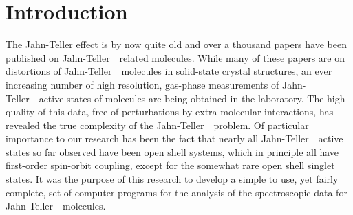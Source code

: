 \documentclass{article}
\newcommand{\JT}{Jahn-Teller\ }
\newcommand{\socjt}{{\bf SOCJT }}
\newcommand{\socrt}{{\bf SOCRT}}
\newcommand{\etoe}{{\bf e2e}}
\begin{document}
\begin{comment}
The following files are included in the distribution file {\tt
  socjt.zip}: 
\begin{description}
\item[{\tt socjt.exe}] Executable file for the main program,
  \socjt, to be run from a MS-DOS prompt.
\item[{\tt socrt.exe}] Executable file for the Renner-Teller
  version, \socrt .
\item[{\tt e2e.exe}] Executable file for the calculation of
  electronic transition intensities from one \JT\ active state to
  another.
\item[{\tt pi2pi.exe}] Executable file for the calculation of
  electronic transition intensities from one Renner-Teller active
  state to another. This file is not yet available.
\item[{\tt inputasst.exe}] Executable file that creates an input
  file for {\tt socjt.exe } based on the answers to a series of
  questions.
\item[{\tt test1}] Plain text input file to test \socjt.
\item[{\tt test2}] Plain text input file to test \socjt. The output
  of the files {\tt test1} and {\tt test2} can be used as input for
  \etoe .
\item[{\tt rt\_test}] Plain text input file to test \socrt .
\item[{\tt e2e\_test}] Plain text input file to test \etoe .
\item[{\tt manual.tex, manual.ps, and manual.pdf}] The users guide for
  the suite of programs. 
\item[{\tt output.zip}] All of the output files that are generated by
  running the test files. 
\end{description}
\end{comment}

\newpage

\section{Introduction} \label{section:intro}

The Jahn-Teller effect is by now quite old and over a thousand papers
have been published on \JT\ related molecules.  While many of these
papers are on distortions of \JT\ molecules in solid-state crystal
structures, an ever increasing number of high resolution, gas-phase
measurements of \JT\ active states of molecules are being obtained in
the laboratory. The high quality of this data, free of perturbations
by extra-molecular interactions, has revealed the true complexity of
the \JT\ problem. Of particular importance to our research has been
the fact that nearly all \JT\ active states so far observed have been
open shell systems, which in principle all have first-order
spin-orbit coupling, except for the somewhat rare open shell singlet
states. It was the purpose of this research to develop a simple
to use, yet fairly complete, set of computer programs for the analysis of the
spectroscopic data for \JT\ molecules.
\end{document}
